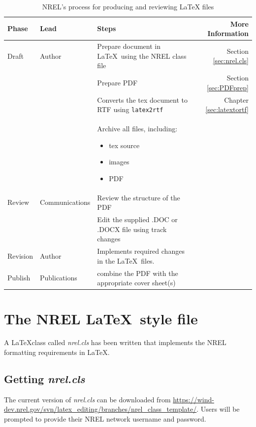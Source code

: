 \documentclass[12pt,letterpaper]{report}
\begin{document}
\begin{table}[!h]
\centering
\caption{NREL's process for producing and reviewing \LaTeX{} files}
\label{Tab:NRELprocess}
\begin{tabular*}{\textwidth}{llp{}r}
\toprule
Phase & Lead & Steps & More Information \\
\midrule
Draft & Author & Prepare document in \LaTeX\ using the NREL class file & Section \ref{sec:nrel.cls} \\
 & & Prepare PDF & Section \ref{sec:PDFprep} \\
 & & Converts the tex document to RTF using \texttt{latex2rtf} & Chapter \ref{sec:latextortf}\\
 & & Archive all files, including:
\begin{itemize}  
 \item tex source
 \item images
 \item PDF 
 \end{itemize} & \\
Review & Communications & Review the structure of the PDF & \\
 & & Edit the supplied .DOC or .DOCX file using track changes & \\
Revision & Author & Implements required changes in the \LaTeX\ files. & \\
Publish & Publications & combine the PDF with the appropriate cover sheet(s) & \\
\bottomrule
\end{tabular*}
\end{table}

\section{The NREL \LaTeX\ style file\label{sec:nrel.cls}}
A \LaTeX class called \emph{nrel.cls} has been written that implements the NREL formatting requirements in \LaTeX.

\subsection{Getting \emph{nrel.cls}}
The current version of \emph{nrel.cls} can be downloaded from \url{https://wind-dev.nrel.gov/svn/latex_editing/branches/nrel_class_template/}. Users will be prompted to provide their NREL network username and password.
\end{document}
